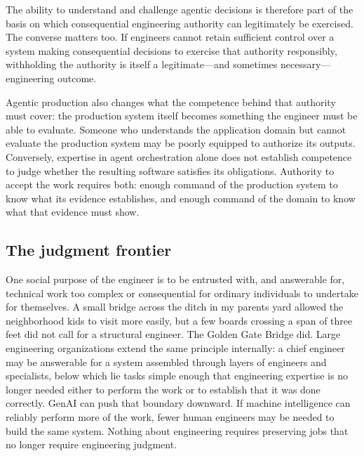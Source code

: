 
The ability to understand and challenge agentic decisions is therefore part of the basis on which consequential engineering authority can legitimately be exercised. The converse matters too. If engineers cannot retain sufficient control over a system making consequential decisions to exercise that authority responsibly, withholding the authority is itself a legitimate---and sometimes necessary---engineering outcome.


Agentic production also changes what the competence behind that authority must cover: the production system itself becomes something the engineer must be able to evaluate. Someone who understands the application domain but cannot evaluate the production system may be poorly equipped to authorize its outputs. Conversely, expertise in agent orchestration alone does not establish competence to judge whether the resulting software satisfies its obligations. Authority to accept the work requires both: enough command of the production system to know what its evidence establishes, and enough command of the domain to know what that evidence must show.

\subsection{The judgment frontier}\label{heading:the-judgment-frontier}


One social purpose of the engineer is to be entrusted with, and answerable for, technical work too complex or consequential for ordinary individuals to undertake for themselves\citep{bugliarello-social-function}. A small bridge across the ditch in my parents\textquotesingle{} yard allowed the neighborhood kids to visit more easily, but a few boards crossing a span of three feet did not call for a structural engineer. The Golden Gate Bridge did. Large engineering organizations extend the same principle internally: a chief engineer may be answerable for a system assembled through layers of engineers and specialists, below which lie tasks simple enough that engineering expertise is no longer needed either to perform the work or to establish that it was done correctly. GenAI can push that boundary downward. If machine intelligence can reliably perform more of the work, fewer human engineers may be needed to build the same system. Nothing about engineering requires preserving jobs that no longer require engineering judgment.


